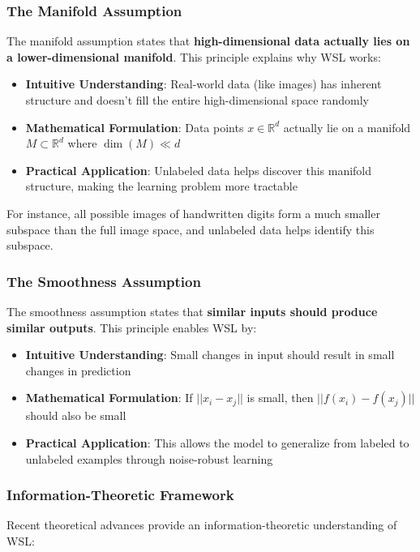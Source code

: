 \documentclass{ieeeaccess}
\begin{document}
\subsubsection{The Manifold Assumption}
The manifold assumption states that \textbf{high-dimensional data actually lies on a lower-dimensional manifold}. This principle explains why WSL works:

\begin{itemize}
\item \textbf{Intuitive Understanding}: Real-world data (like images) has inherent structure and doesn't fill the entire high-dimensional space randomly
\item \textbf{Mathematical Formulation}: Data points $x \in \mathbb{R}^d$ actually lie on a manifold $M \subset \mathbb{R}^d$ where $\dim(M) \ll d$
\item \textbf{Practical Application}: Unlabeled data helps discover this manifold structure, making the learning problem more tractable
\end{itemize}

For instance, all possible images of handwritten digits form a much smaller subspace than the full image space, and unlabeled data helps identify this subspace.

\subsubsection{The Smoothness Assumption}
The smoothness assumption states that \textbf{similar inputs should produce similar outputs}. This principle enables WSL by:

\begin{itemize}
\item \textbf{Intuitive Understanding}: Small changes in input should result in small changes in prediction
\item \textbf{Mathematical Formulation}: If $||x_i - x_j||$ is small, then $||f(x_i) - f(x_j)||$ should also be small
\item \textbf{Practical Application}: This allows the model to generalize from labeled to unlabeled examples through noise-robust learning
\end{itemize}

\subsubsection{Information-Theoretic Framework}
Recent theoretical advances \cite{b29,b30} provide an information-theoretic understanding of WSL:
\end{document}
